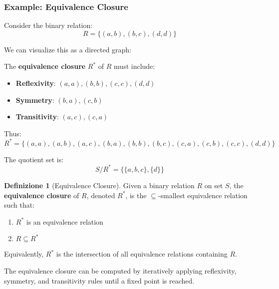 \documentclass[11pt,a4paper]{article}
\theoremstyle{definition}
\newtheorem{definition}{Definizione}[section]
\theoremstyle{plain}
\theoremstyle{remark}
\begin{document}
\subsubsection{Example: Equivalence Closure}

Consider the binary relation:
\[
R = \{(a, b), (b, c), (d, d)\}
\]

We can visualize this as a directed graph:
\begin{center}
\end{center}

The \textbf{equivalence closure} $R^*$ of $R$ must include:
\begin{itemize}
    \item \textbf{Reflexivity}: $(a, a), (b, b), (c, c), (d, d)$
    \item \textbf{Symmetry}: $(b, a), (c, b)$
    \item \textbf{Transitivity}: $(a, c), (c, a)$
\end{itemize}

Thus:
\[
R^* = \{(a, a), (a, b), (a, c), (b, a), (b, b), (b, c), (c, a), (c, b), (c, c), (d, d)\}
\]

The quotient set is:
\[
S/R^* = \{\{a, b, c\}, \{d\}\}
\]

\begin{definition}[Equivalence Closure]
Given a binary relation $R$ on set $S$, the \textbf{equivalence closure} of $R$, denoted $R^*$, is the $\subseteq$-smallest equivalence relation such that:
\begin{enumerate}
    \item $R^*$ is an equivalence relation
    \item $R \subseteq R^*$
\end{enumerate}

Equivalently, $R^*$ is the intersection of all equivalence relations containing $R$.
\end{definition}

The equivalence closure can be computed by iteratively applying reflexivity, symmetry, and transitivity rules until a fixed point is reached.
\end{document}
